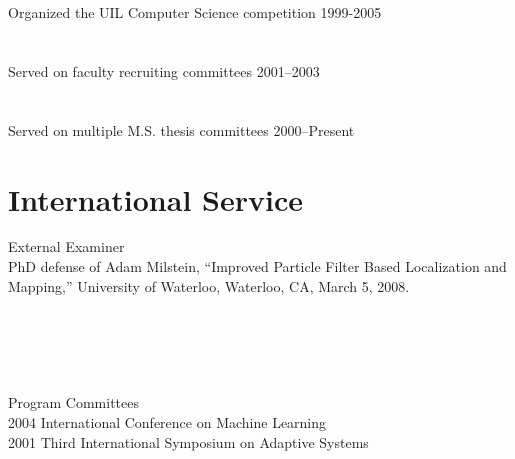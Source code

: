 \documentclass[12pt,letter]{resume}
\begin{document}
\vspace*{-1.25\baselineskip}
\section{}{Organized the UIL Computer Science competition 1999-2005}{}

\vspace*{-1.25\baselineskip}
\section{}{Served on faculty recruiting committees 2001--2003}{}

\vspace*{-1.25\baselineskip}
\section{}{Served on multiple M.S. thesis committees 2000--Present}{}

\section{International Service}{External Examiner}
{\\
PhD defense of Adam Milstein, ``Improved Particle Filter Based Localization and Mapping,''
University of Waterloo, Waterloo, CA, March 5, 2008.
}

\section{\ }{Program Committees}
        {\\
2004 International Conference on Machine Learning\\
2001 Third International Symposium on Adaptive Systems \\
}
\end{document}
